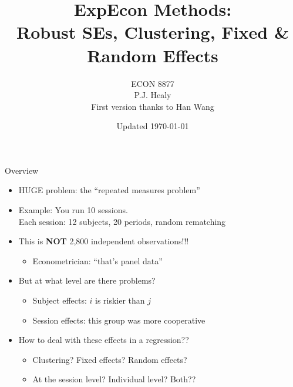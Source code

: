 

\title[Regressions 1]{ExpEcon Methods:\\Robust SEs, Clustering, Fixed \& Random Effects}
\author[ECON 8877]{ECON 8877\\P.J. Healy\\First version thanks to Han Wang} \color{metrop}
\institute[OSU]{}
\date[]{\vfill {\tiny Updated \today}}




\frame{\maketitle}

\begin{frame}{Overview}
\begin{itemize}
    \item HUGE problem: the ``repeated measures problem''
    \item Example: You run 10 sessions.\\
    Each session: 12 subjects, 20 periods, random rematching
    \item This is \textbf{NOT} 2,800 independent observations!!!
    \begin{itemize}
        \item Econometrician: ``that's panel data''
    \end{itemize}
    \item But at what level are there problems?
    \begin{itemize}
        \item Subject effects: $i$ is riskier than $j$
        \item Session effects: this group was more cooperative
    \end{itemize}
    \item How to deal with these effects in a regression??
    \begin{itemize}
        \item Clustering? Fixed effects? Random effects?
        \item At the session level? Individual level? Both??
    \end{itemize}
\end{itemize}
    
\end{frame}

